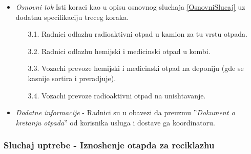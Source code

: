 \documentclass[10 pt]{article}
\begin{document}
\begin{itemize}
			\item\textit{Osnovni tok}
				Isti koraci kao u opisu osnovnog sluchaja \ref{OsnovniSlucaj}
				uz dodatnu specifikaciju treceg koraka.
				\begin{enumerate}
					\item [3.1.] Radnici odlazhu radioaktivni otpad u kamion za tu vrstu otpada.
					\item [3.2.] Radnici odlazhu hemijski i medicinski otpad u kombi.
					\item [3.3.] Vozachi prevoze hemijski i medicinski otpad na deponiju (gde se kasnije sortira i preradjuje).
					\item [3.4.] Vozachi prevoze radioaktivni otpad na unishtavanje.
				\end{enumerate}
			
			\item\textit{Dodatne informacije} - Radnici su u obavezi da preuzmu ''\textit{Dokument o kretanju otpada}'' od korisnika usluga i dostave ga koordinatoru.
			
		\end{itemize}
	
	\subsubsection{Sluchaj uptrebe - Iznoshenje otapda za reciklazhu}
		
\end{document}
